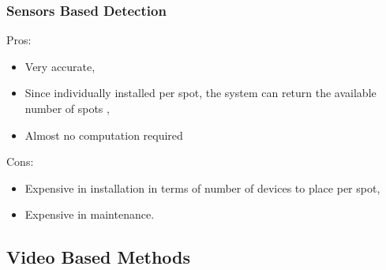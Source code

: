 \documentclass{beamer}
\begin{document}
\begin{frame}
\frametitle{Sensors Based Detection}

Pros:
\begin{itemize}
	\item Very accurate,
	\item Since individually installed per spot, the system can return the available number of spots \cite{Lee2008},
	\item Almost no computation required
\end{itemize}

Cons:
\begin{itemize}
	\item Expensive in installation in terms of number of devices to place per spot,
	\item Expensive in maintenance.
\end{itemize}

\end{frame}

\subsection{Video Based Methods}
\end{document}
